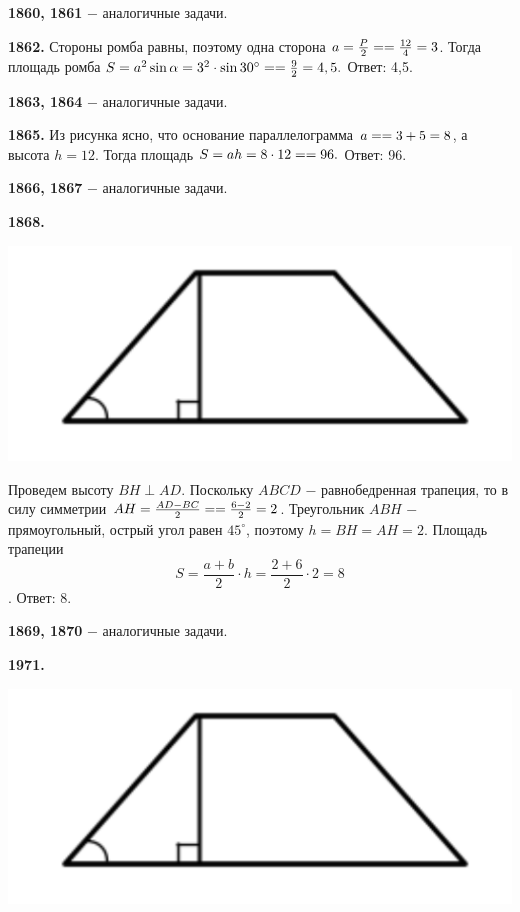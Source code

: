 \textbf{1860, 1861} $-$ аналогичные задачи.

\textbf{1862.} Стороны ромба равны, поэтому одна сторона $a = \frac{P}{2} = \linebreak = \frac{12}{4} = 3$. Тогда площадь ромба $S = a^2\sin{\alpha} = 3^2\cdot\sin{30^\circ} = \linebreak = \frac{9}{2} = 4,5.$ \newline \null \hspace*{\fill} Ответ: 4,5.

\textbf{1863, 1864} $-$ аналогичные задачи.

\textbf{1865.} Из рисунка ясно, что основание параллелограмма $a = \linebreak = 3+ 5 = 8$, а высота $h = 12$. Тогда площадь $S = ah = 8\cdot12=\linebreak=96.$ \newline \null \hspace*{\fill} Ответ: 96.

\textbf{1866, 1867} $-$ аналогичные задачи.

\textbf{1868.}

{\centering \includegraphics[width=0.5\linewidth]{Geometry/Content/20.png}
	
}

Проведем  высоту $BH \perp AD$.  Поскольку $ABCD$ $-$ равнобедренная трапеция, то в силу симметрии $AH = \frac{AD - BC}{2} = \linebreak = \frac{6 - 2}{2} = 2$. Треугольник $ABH$ $-$ прямоугольный, острый угол равен $45^\circ$, поэтому $h =BH = AH = 2$. Площадь трапеции
\[
S = \frac{a + b}{2}\cdot h=\frac{2 + 6}{2}\cdot 2 = 8
\].\null \hspace*{\fill} Ответ: 8.

\textbf{1869, 1870} $-$ аналогичные задачи. 

\clearpage

\textbf{1971.}

{\centering \includegraphics[width=0.5\linewidth]{Geometry/Content/20.png}
	
}

